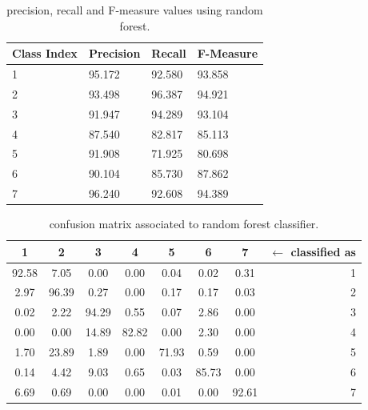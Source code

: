 \documentclass[a4paper, 10pt]{article}
\begin{document}
\begin{table}[h!]
\centering
\begin{tabular}{|l|l|l|l|}
\hline
\textbf{Class Index} & \textbf{Precision} & \textbf{Recall} & \textbf{F-Measure}\\\hline
1 & 95.172 & 92.580& 93.858\\\hline
2 & 93.498 & 96.387& 94.921\\\hline
3 & 91.947 & 94.289& 93.104\\\hline
4 & 87.540 & 82.817& 85.113\\\hline
5 & 91.908 & 71.925& 80.698\\\hline
6 & 90.104 & 85.730& 87.862\\\hline
7 & 96.240 & 92.608& 94.389\\\hline
\end{tabular}
\caption{precision, recall and F-measure values using random forest.}
\label{tab:rf_test_pr}
\end{table}

\begin{table}[H]
\centering
\begin{tabular}{|*{7}{c|}r|}
\hline

1 &2 &3 &4 &5 &6 &7 & $\leftarrow$ classified as \\\hline

\cellcolor{black!15}92.58 &7.05 &0.00 &0.00 &0.04 &0.02 &0.31 & 1 \\\hline

2.97 &\cellcolor{black!15}96.39 &0.27 &0.00 &0.17 &0.17 &0.03 & 2 \\\hline

0.02 &2.22 &\cellcolor{black!15}94.29 &0.55 &0.07 &2.86 &0.00 & 3 \\\hline

0.00 &0.00 &14.89 &\cellcolor{black!15}82.82 &0.00 &2.30 &0.00 & 4 \\\hline

1.70 &23.89 &1.89 &0.00 &\cellcolor{black!15}71.93 &0.59 &0.00 & 5 \\\hline

0.14 &4.42 &9.03 &0.65 &0.03 &\cellcolor{black!15}85.73 &0.00 & 6 \\\hline

6.69 &0.69 &0.00 &0.00 &0.01 &0.00 &\cellcolor{black!15}92.61 & 7 \\\hline

\end{tabular}
 \caption{confusion matrix associated to random forest classifier.}
 \label{tab:rf_cm}
\end{table}
\end{document}
